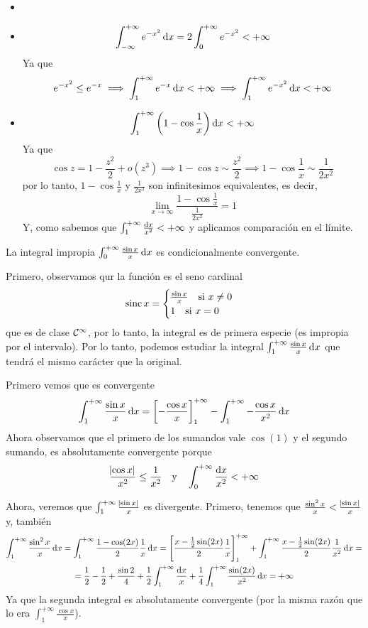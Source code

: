 \begin{example*}
	\begin{itemize}
		\item[]
		\item
			\[
				\int^{+\infty}_{-\infty} e^{-x^2} \dif x = 2
				\int^{+\infty}_0 e^{-x^2} < +\infty
			\]
			Ya que 
			\[
				e^{-x^2} \leq e^{-x} \implies \int^{+\infty}_1 e^{-x}
				\dif x < +\infty \implies \int^{+\infty}_1 e^{-x^2}
				\dif x < +\infty
			\]
		\item
			\[
				\int^{+\infty}_1 \left( 1 - \cos \frac{1}{x} \right)
				\dif x < +\infty
			\]
			Ya que
			\[
				\cos z = 1 - \frac{z^2}{2} + o(z^3) \implies
				1-\cos z \sim \frac{z^2}{2} \implies
				1-\cos \frac{1}{x} \sim \frac{1}{2x^2}
			\]
			por lo tanto, $1-\cos \frac{1}{x}$ y $\frac{1}{2x^2}$ son 
			infinitesimos equivalentes, es decir,
			\[
				\lim_{x \to \infty} \frac{1-\cos \frac{1}{x}}
				{\frac{1}{2x^2}} = 1
			\]
			Y, como sabemos que $\huge\int^{+\infty}_1 \frac{\dif x}{x^2} <
			+\infty$ y aplicamos comparación en el límite.
	\end{itemize}
\end{example*}

\begin{example*}
	La integral impropia $\int^{+\infty}_0 \frac{\sin x}{x} \dif x$ es
	condicionalmente convergente.

	Primero, observamos qur la función es el seno cardinal
	\[
		\operatorname{sinc} x = \begin{cases} \frac{\sin x}{x} \quad \text{si } x \neq 0 \\
			1 \quad \text{si } x = 0 \end{cases}
	\]
	que es de clase $\mathcal{C}^{\infty}$, por lo tanto, la integral es de primera especie
	(es impropia por el intervalo). Por lo tanto, podemos estudiar la integral
	$\int^{+\infty}_1 \frac{\sin x}{x} \dif x$ que tendrá el mismo carácter que
	la original.

	Primero vemos que es convergente
	\[
		\int^{+\infty}_1 \frac{\sin x}{x}\dif x =
		\left[-\frac{\cos x}{x}\right]^{+\infty}_1 - \int^{+\infty}_1 
		-\frac{\cos x}{x^2} \dif x
	\]
	Ahora observamos que el primero de los sumandos vale $\cos(1)$ y el segundo
	sumando, es absolutamente convergente porque
	\[
		\frac{\abs{\cos x}}{x^2} \leq \frac{1}{x^2} \quad \text{y} \quad
		\int^{+\infty}_0 \frac{\dif x}{x^2} < +\infty
	\]

	Ahora, veremos que $\int^{+\infty}_1 \frac{\abs{\sin x}}{x}$ es divergente.
	Primero, tenemos que $\frac{\sin^2 x}{x} < \frac{\abs{\sin x}}{x}$ y, tambi\'en
	\begin{gather*}
		\int^{+\infty}_1 \frac{\sin^2 x}{x} \dif x = \int^{+\infty}_1
		\frac{1 - \cos(2x)}{2} \frac{1}{x} \dif x = 
		\left[ \frac{x - \frac{1}{2}\sin(2x)}{2}\frac{1}{x} \right]^{+\infty}_1
		+ \int^{+\infty}_1 \frac{x -\frac{1}{2}\sin(2x)}{2}\frac{1}{x^2}\dif x=
		\\ = \frac{1}{2} - \frac{1}{2} + \frac{\sin 2}{4} +
		\frac{1}{2}\int^{+\infty}_{1} \frac{\dif x}{x} + \frac{1}{4}
		\int^{+\infty}_1 \frac{\sin(2x)}{x^2} \dif x = +\infty
	\end{gather*}
	Ya que la segunda integral es absolutamente convergente (por la misma razón que
	lo era $\int^{+\infty}_1 \frac{\cos x}{x}$).
\end{example*}
